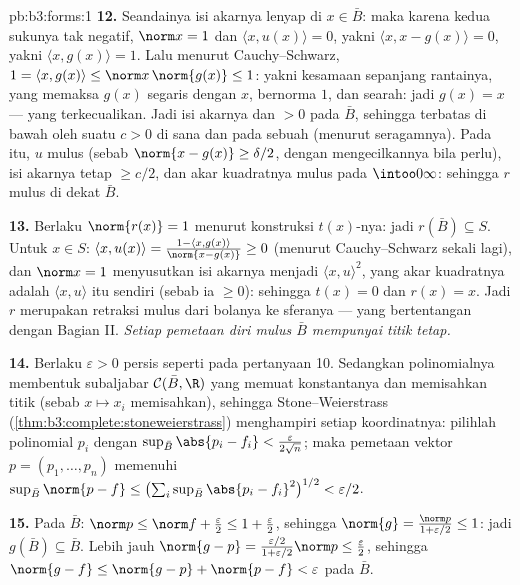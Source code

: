 \begin{solution}{pb:b3:forms:1}
\textbf{12.} Seandainya isi akarnya lenyap di $x \in \bar B$:
maka karena kedua sukunya tak negatif, $\norm x = 1$ dan
$\langle x, u(x)\rangle = 0$, yakni $\langle x, x -
g(x)\rangle = 0$, yakni $\langle x, g(x)\rangle = 1$. Lalu menurut
Cauchy--Schwarz, $1 = \langle x, g(x)\rangle \leq
\norm x\,\norm{g(x)} \leq 1$: yakni kesamaan sepanjang rantainya, yang
memaksa $g(x)$ segaris dengan $x$, bernorma $1$, dan searah:
jadi $g(x) = x$ --- yang terkecualikan. Jadi isi akarnya  dan
$> 0$ pada $\bar B$, sehingga terbatas di bawah oleh suatu $c > 0$
di sana dan pada sebuah  (menurut  seragamnya). Pada
 itu, $u$ mulus (sebab $\norm{x - g(x)} \geq
\delta/2$, dengan mengecilkannya bila perlu), isi akarnya tetap $\geq
c/2$, dan akar kuadratnya mulus pada $\intoo0\infty$: sehingga $r$
mulus di dekat $\bar B$.

\textbf{13.} Berlaku $\norm{r(x)} = 1$ menurut konstruksi $t(x)$-nya:
jadi $r(\bar B) \subseteq S$. Untuk $x \in S$: $\langle x,
u(x)\rangle = \frac{1 - \langle x, g(x)\rangle}{\norm{x -
g(x)}} \geq 0$ (menurut Cauchy--Schwarz sekali lagi), dan $\norm x =
1$ menyusutkan isi akarnya menjadi $\langle x, u\rangle^2$, yang
akar kuadratnya adalah $\langle x, u\rangle$ itu sendiri (sebab ia $\geq
0$): sehingga $t(x) = 0$ dan $r(x) = x$. Jadi $r$ merupakan retraksi
mulus dari bolanya ke sferanya --- yang bertentangan dengan
Bagian II. \emph{Setiap pemetaan diri mulus $\bar B$ mempunyai
titik tetap.}

\textbf{14.} Berlaku $\varepsilon > 0$ persis seperti pada pertanyaan 10.
Sedangkan polinomialnya membentuk subaljabar $\mathcal C(\bar B,
\R)$ yang memuat konstantanya dan memisahkan titik (sebab $x
\mapsto x_i$ memisahkan), sehingga Stone--Weierstrass
(\cref{thm:b3:complete:stoneweierstrass}) menghampiri setiap
koordinatnya: pilihlah polinomial $p_i$ dengan $\sup_{\bar
B}\abs{p_i - f_i} < \frac{\varepsilon}{2\sqrt n}$; maka
pemetaan vektor $p = (p_1, \dots, p_n)$ memenuhi
$\sup_{\bar B}\norm{p - f} \leq
\bigl(\sum_i\sup_{\bar B}\abs{p_i - f_i}^2\bigr)^{1/2} <
\varepsilon/2$.

\textbf{15.} Pada $\bar B$: $\norm p \leq \norm f +
\frac\varepsilon2 \leq 1 + \frac\varepsilon2$, sehingga
$\norm{g} = \frac{\norm p}{1 + \varepsilon/2} \leq 1$:
jadi $g(\bar B) \subseteq \bar B$. Lebih jauh $\norm{g - p} =
\frac{\varepsilon/2}{1 + \varepsilon/2}\norm p \leq
\frac\varepsilon2$, sehingga $\norm{g - f} \leq \norm{g - p} +
\norm{p - f} < \varepsilon$ pada $\bar B$.


\end{solution}
